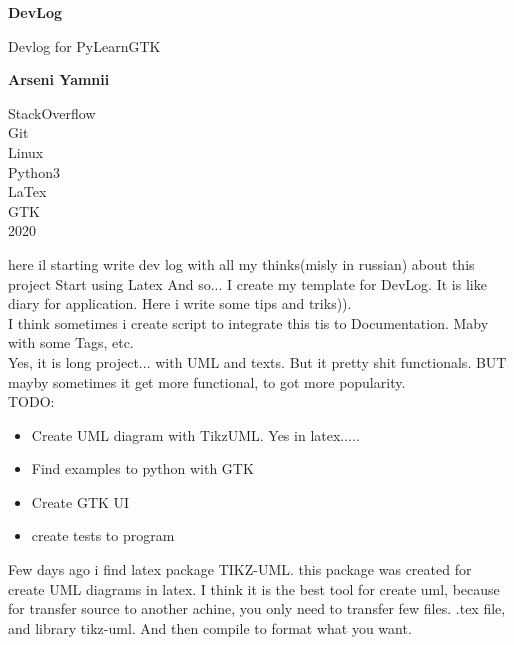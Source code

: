 \documentclass{article}
\begin{document}
\begin{titlepage}
   \begin{center}
       \vspace*{1cm}

       \textbf{DevLog}

       \vspace{0.5cm}
        Devlog for PyLearnGTK

       \vspace{1.5cm}

       \textbf{Arseni Yamnii}

       \vfill


       \vspace{0.8cm}



       StackOverflow\\
       Git\\
       Linux\\
       Python3\\
       LaTex\\
       GTK\\
       2020

   \end{center}
\end{titlepage}
\tableofcontents
\newpage
{}
here il starting write dev log with all my thinks(misly in russian) about this project
\newpage
{}
Start using Latex
And so... I create my template for DevLog. It is like diary for application. Here i write some tips and triks)).\\
I think sometimes i create script to integrate this tis to Documentation. Maby with some Tags, etc.\\
Yes, it is long project... with UML and texts. But it pretty shit functionals. BUT mayby sometimes it get more functional, to got more popularity.\\
TODO:
\begin{itemize}
  \item Create UML diagram with TikzUML. Yes in latex.....
  \item Find examples to python with GTK
  \item Create GTK UI
  \item create tests to program
\end{itemize}
\newpage
{}
Few days ago i find latex package TIKZ-UML. this package was created for create UML diagrams in latex. I think it is the best tool for create uml, because for transfer source to another achine, you only need to transfer few files. .tex file, and library tikz-uml. And then compile to format what you want.\\
\end{document}
